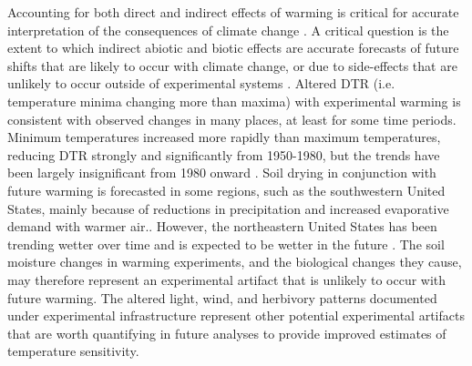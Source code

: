\documentclass{article}
\begin{document}
\par Accounting for both direct and indirect effects of warming is critical for accurate interpretation of the consequences of climate change \citep{kharouba2015}. %
A critical question is the extent to which indirect abiotic and biotic effects are accurate forecasts of future shifts that are likely to occur with climate change, or due to side-effects that are unlikely to occur outside of experimental systems \citep{moise2010,diamond2013}.%
 Altered DTR (i.e. temperature minima changing more than maxima) with experimental warming is consistent with observed changes in many places, at least for some time periods. Minimum temperatures increased more rapidly than maximum temperatures, reducing DTR strongly and significantly from 1950-1980, but the trends have been largely insignificant from 1980 onward \citep{thorne2016,vose2005}. Soil drying in conjunction with future warming is forecasted in some regions, such as the southwestern United States, mainly because of reductions in precipitation and increased evaporative demand with warmer air.\citep{dai2013,seager2013}. However, the northeastern United States has been trending wetter over time and is expected to be wetter in the future \citep{seager2014,shuman2017}. The soil moisture changes in warming experiments, and the biological changes they cause, may therefore represent an experimental artifact that is unlikely to occur with future warming. The altered light, wind, and herbivory patterns documented under experimental infrastructure \citep{kennedy1995,moise2010,wolkovich2012,hoeppner2012, clark2014b} represent other potential experimental artifacts that are worth quantifying in future analyses to provide improved estimates of temperature sensitivity.
\end{document}
